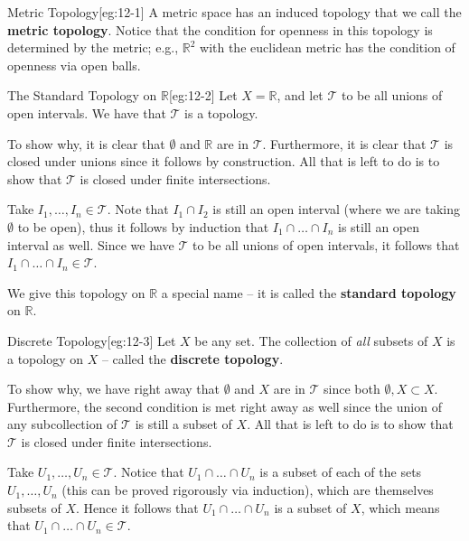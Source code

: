 \begin{egBox}{Metric Topology}[eg:12-1]
    A metric space has an induced topology that we call the 
    \textbf{metric topology}.
    Notice that the condition for openness in this topology is determined 
    by the metric; e.g., \( \mathbb{R}^{ 2 } \) with the euclidean metric
    has the condition of openness via open balls.
\end{egBox}

\begin{egBox}{The Standard Topology on \( \mathbb{R} \)}[eg:12-2]
    Let \( X = \mathbb{R} \), and let \( \mathcal{T} \) to be all unions of 
    open intervals. We have that \( \mathcal{T} \) is a topology.

    \baseSkip

    To show why, it is clear that \( \emptyset \) and \( \mathbb{R} \) are in 
    \( \mathcal{T} \). 
    Furthermore, it is clear that \( \mathcal{T} \) is closed under unions since it follows by construction. 
    All that is left to do is to show that
    \( \mathcal{T} \) is closed under finite intersections.

    \baseSkip

    Take \( I_{ 1 }, \ldots, I_{ n } \in \mathcal{T} \). Note that \( I_{ 1 } 
    \cap I_{ 2 } \) is still an open interval (where
    we are taking \( \emptyset \) to be open), thus it follows by induction 
    that \( I_{ 1 } \cap \ldots \cap I_{ n } \) is still
    an open interval as well. Since we have \( \mathcal{T} \) to be all unions 
    of open intervals, it follows that
    \( I_{ 1 } \cap \ldots \cap I_{ n } \in \mathcal{T} \).

    \baseSkip

    We give this topology on \( \mathbb{R} \) a special name -- it is called 
    the \textbf{standard topology} on \( \mathbb{R} \).
\end{egBox}

\begin{egBox}{Discrete Topology}[eg:12-3]
    Let \( X \) be any set. The collection of \textit{all} subsets of \( X \) 
    is a topology on \( X \) -- called the \textbf{discrete topology}.

    \baseSkip

    To show why, we have right away that \( \emptyset \) and \( X \) are in 
    \( \mathcal{T} \) since both
    \( \emptyset, X \subset X \). 
    Furthermore, the second condition is met right away as well since the union 
    of any subcollection of \( \mathcal{T} \) is still a subset of \( X \). 
    All that is left to do is to show that \( \mathcal{T} \) is closed under 
    finite intersections.

    \baseSkip

    Take \( U_{ 1 }, \ldots, U_{ n } \in \mathcal{T} \). Notice that \( U_{ 1 } \cap \ldots \cap U_{ n } \) is a subset of each
    of the sets \( U_{ 1 }, \ldots, U_{ n } \) (this can be proved rigorously via induction), which are themselves subsets of
    \( X \). Hence it follows that \( U_{ 1 } \cap \ldots \cap U_{ n } \) is a subset of \( X \), which means that
    \( U_{ 1 } \cap \ldots \cap U_{ n } \in \mathcal{T} \).
\end{egBox}

